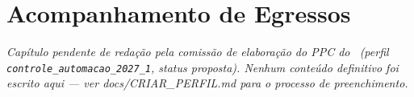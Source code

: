 \chapter{Acompanhamento de Egressos}

\textit{Capítulo pendente de redação pela comissão de elaboração do PPC do
\ppccurso\ (perfil \texttt{controle\_automacao\_2027\_1}, status
proposta). Nenhum conteúdo definitivo foi escrito aqui — ver
docs/CRIAR\_PERFIL.md para o processo de preenchimento.}
